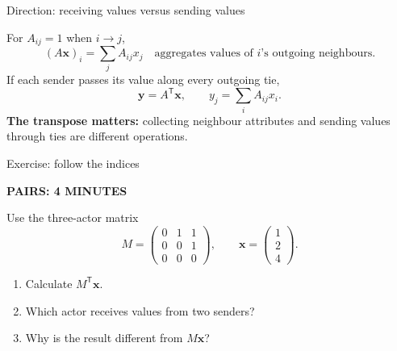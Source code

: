 \documentclass[aspectratio=169,11pt]{beamer}
\newcommand{\activity}[1]{{\small\color{accent}\bfseries #1}\par\medskip}
\begin{document}
\begin{frame}{Direction: receiving values versus sending values}

For $A_{ij}=1$ when $i\to j$,
\[(A\mathbf{x})_i=\sum_j A_{ij}x_j
\quad\text{aggregates values of }i\text{'s outgoing neighbours}.\]
If each sender passes its value along every outgoing tie,
\[\mathbf{y}=A^{\mathsf T}\mathbf{x},\qquad
 y_j=\sum_i A_{ij}x_i.\]
\textbf{The transpose matters:} collecting neighbour attributes and sending values through ties are different operations.


\end{frame}

\begin{frame}{Exercise: follow the indices}

\activity{PAIRS: 4 MINUTES}

Use the three-actor matrix
\[M=\begin{pmatrix}0&1&1\\0&0&1\\0&0&0\end{pmatrix},\qquad
\mathbf{x}=\begin{pmatrix}1\\2\\4\end{pmatrix}.\]
\begin{enumerate}
\item Calculate $M^{\mathsf T}\mathbf{x}$.
\item Which actor receives values from two senders?
\item Why is the result different from $M\mathbf{x}$?
\end{enumerate}


\end{frame}
\end{document}
